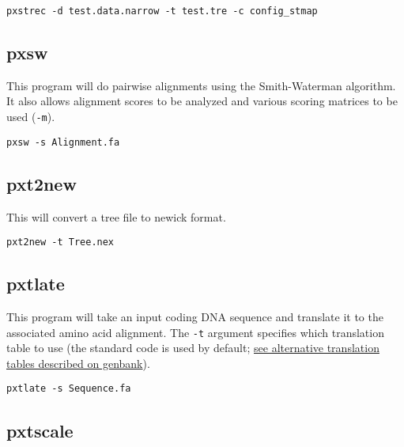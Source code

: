 \documentclass[12pt,letterpaper]{memoir}
\begin{document}
\begin{flushleft}
\begin{verbatim}
pxstrec -d test.data.narrow -t test.tre -c config_stmap
\end{verbatim}
\end{flushleft}

\subsection{pxsw}

This program will do pairwise alignments using the Smith-Waterman algorithm. It also allows alignment scores to be analyzed and various scoring matrices to be used (\texttt{-m}).

\begin{flushleft}
\begin{verbatim}
pxsw -s Alignment.fa
\end{verbatim}
\end{flushleft}

\subsection{pxt2new}

This will convert a tree file to newick format.

\begin{flushleft}
\begin{verbatim}
pxt2new -t Tree.nex
\end{verbatim}
\end{flushleft}

\subsection{pxtlate}

This program will take an input coding DNA sequence and translate it to the associated amino acid alignment. The \texttt{-t} argument specifies which translation table to use (the standard code is used by default; \href{https://www.ncbi.nlm.nih.gov/Taxonomy/Utils/wprintgc.cgi}{see alternative translation tables described on genbank}).


\begin{flushleft}
\begin{verbatim}
pxtlate -s Sequence.fa
\end{verbatim}
\end{flushleft}

\subsection{pxtscale}
\end{document}
